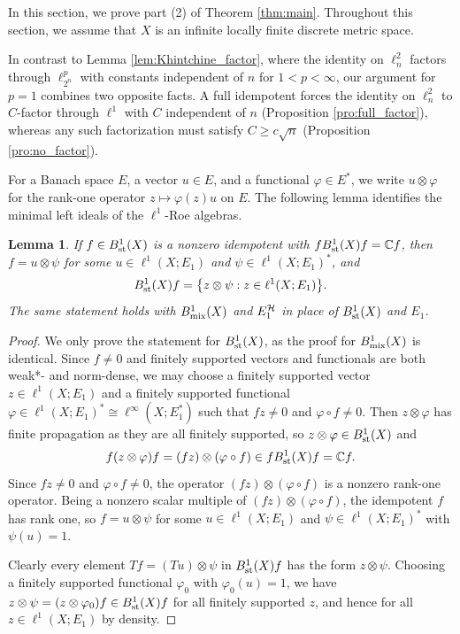 \documentclass[11pt,reqno]{amsart}
\theoremstyle{definition}
\theoremstyle{plain}
\newtheorem{Lem}[Def]{Lemma}
\def\ox{\otimes}
\begin{document}
In this section, we prove part (2) of Theorem \ref{thm:main}. Throughout this section, we assume that $X$ is an infinite locally finite discrete metric space.

In contrast to Lemma \ref{lem:Khintchine_factor}, where the identity on $\ell^2_n$ factors through $\ell^p_{2^n}$ with constants independent of $n$ for $1<p<\infty$, our argument for $p=1$ combines two opposite facts. A full idempotent forces the identity on $\ell^2_n$ to $C$-factor through $\ell^1$ with $C$ independent of $n$ (Proposition \ref{pro:full_factor}), whereas any such factorization must satisfy $C\ge c\sqrt n$ (Proposition \ref{pro:no_factor}).

For a Banach space $E$, a vector $u\in E$, and a functional $\varphi\in E^*$, we write $u\ox\varphi$ for the rank-one operator $z\mapsto\varphi(z)u$ on $E$. The following lemma identifies the minimal left ideals of the $\ell^1$-Roe algebras.

\begin{Lem}\label{lem:minimal}
If $f\in B^1_{\textup{st}}(X)$ is a nonzero idempotent with $fB^1_{\textup{st}}(X)f=\mathbb C f$, then $f=u\ox\psi$ for some $u\in\ell^1(X;E_1)$ and $\psi\in\ell^1(X;E_1)^*$, and
\[
B^1_{\textup{st}}(X)f=\big\{z\ox\psi:z\in\ell^1(X;E_1)\big\}.
\]
The same statement holds with $B^1_{\textup{mix}}(X)$ and $E_1^{\mathcal H}$ in place of $B^1_{\textup{st}}(X)$ and $E_1$.
\end{Lem}

\begin{proof}
We only prove the statement for $B^1_{\textup{st}}(X)$, as the proof for $B^1_{\textup{mix}}(X)$ is identical. Since $f\ne 0$ and finitely supported vectors and functionals are both weak*- and norm-dense, we may choose a finitely supported vector $z\in\ell^1(X;E_1)$ and a finitely supported functional $\varphi\in\ell^1(X;E_1)^*\cong\ell^\infty(X;E_1^*)$ such that $fz\ne 0$ and $\varphi\circ f\ne 0$. Then $z\ox\varphi$ has finite propagation as they are all finitely supported, so $z\ox\varphi\in B^1_{\textup{st}}(X)$ and
\[
f(z\ox\varphi)f=(fz)\ox(\varphi\circ f)\in fB^1_{\textup{st}}(X)f=\IC f.
\]
Since $fz\ne 0$ and $\varphi\circ f\ne 0$, the operator $(fz)\ox(\varphi\circ f)$ is a nonzero rank-one operator. Being a nonzero scalar multiple of $(fz)\ox(\varphi\circ f)$, the idempotent $f$ has rank one, so $f=u\ox\psi$ for some $u\in\ell^1(X;E_1)$ and $\psi\in\ell^1(X;E_1)^*$ with $\psi(u)=1$.

Clearly every element $Tf=(Tu)\ox\psi$ in $B^1_{\textup{st}}(X)f$ has the form $z\ox\psi$. Choosing a finitely supported functional $\varphi_0$ with $\varphi_0(u)=1$, we have $z\ox\psi=(z\ox\varphi_0)f\in B^1_{\textup{st}}(X)f$ for all finitely supported $z$, and hence for all $z\in\ell^1(X;E_1)$ by density.
\end{proof}
\end{document}
